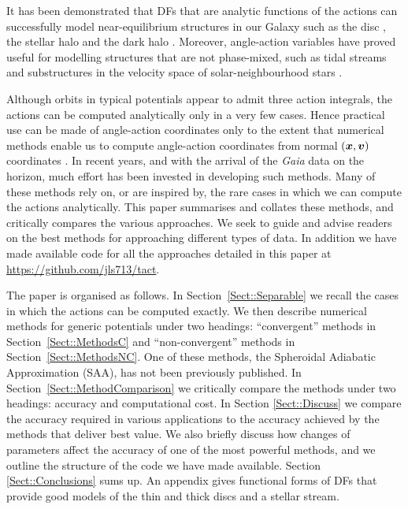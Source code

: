 \documentclass[useAMS,usenatbib,fleqn,a4paper]{mn2e}
\newcommand{\bs}[1]{\bmath{#1}}
\begin{document}
It has been demonstrated that DFs that are analytic functions of the actions
can successfully model near-equilibrium structures in our Galaxy such as the
disc \citep{Binney2010,Binney2012b,BovyRix2013,Piffl2014,SandersBinneyEDF},
the stellar halo \citep{WilliamsEvans2015,DasBinney} and the dark halo
\citep{BinneyPiffl2015}.  Moreover, angle-action variables have proved useful for
modelling structures that are not phase-mixed, such as tidal streams
\citep{HelmiWhite1999,SandersBinney2013a,Bovy2014,Sanders2014} and
substructures in the velocity space of solar-neighbourhood stars
\citep{Sellwood2010,McMillan2011}.

Although orbits in typical potentials appear to admit three action integrals,
the actions can be computed analytically only in a very few cases. Hence
practical use can be made of angle-action coordinates only to the extent that
numerical methods enable us to compute angle-action coordinates from normal
$(\bs{x},\bs{v})$ coordinates . In recent years, and with the arrival of the
\emph{Gaia} data on the horizon, much effort has been invested in developing
such methods. Many of these methods rely on, or are inspired by, the rare
cases in which we can compute the actions analytically.  This paper
summarises and collates these methods, and critically compares the various
approaches.  We seek to guide and advise readers on the best methods for
approaching different types of data. In addition we have made available code
for all the approaches detailed in this paper at
\href{https://github.com/jls713/tact}{https://github.com/jls713/tact}.

The paper is organised as follows. In Section~\ref{Sect::Separable} we recall
the cases in which the actions can be computed exactly. We then describe
numerical methods for generic potentials under two headings: ``convergent''
methods in Section~\ref{Sect::MethodsC} and ``non-convergent'' methods in
Section~\ref{Sect::MethodsNC}. One of these methods, the Spheroidal Adiabatic
Approximation (SAA), has not been previously published. In
Section~\ref{Sect::MethodComparison} we critically compare the methods under
two headings: accuracy and computational cost. In Section \ref{Sect::Discuss}
we compare the accuracy required in various applications to the accuracy
achieved by the methods that deliver best value. We also
briefly discuss how changes of parameters affect the accuracy of one of the
most powerful methods, and we outline the structure of the code we have made
available. Section \ref{Sect::Conclusions} sums up. An appendix gives
functional forms of DFs that provide good models of the thin and thick discs
and a stellar stream.
\end{document}
